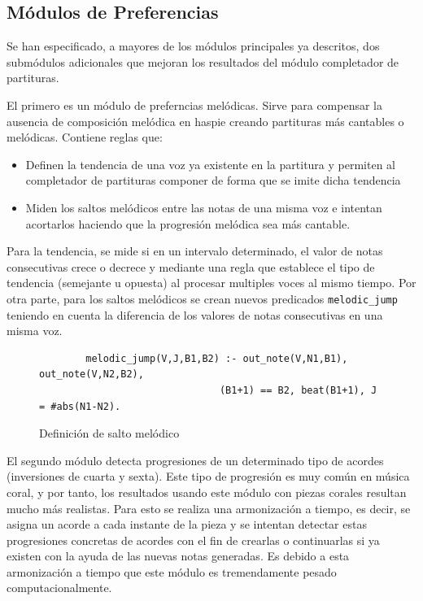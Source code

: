 \subsection{Módulos de Preferencias}
Se han especificado, a mayores de los módulos principales ya descritos, dos submódulos adicionales que mejoran los resultados del módulo completador de partituras.

El primero es un módulo de preferncias melódicas. Sirve para compensar la ausencia de composición melódica en haspie creando partituras más cantables o melódicas. Contiene reglas que:
\begin{itemize}
	\item Definen la tendencia de una voz ya existente en la partitura y permiten al completador de partituras componer de forma que se imite dicha tendencia
	\item Miden los saltos melódicos entre las notas de una misma voz e intentan acortarlos haciendo que la progresión melódica sea más cantable.
\end{itemize}

Para la tendencia, se mide si en un intervalo determinado, el valor de notas consecutivas crece o decrece y mediante una regla que establece el tipo de tendencia (semejante u opuesta) al procesar multiples voces al mismo tiempo. Por otra parte, para los saltos melódicos se crean nuevos predicados \texttt{melodic\_jump} teniendo en cuenta la diferencia de los valores de notas consecutivas en una misma voz.

\begin{figure} [h]
	\centering
	\begin{verbatim}
		melodic_jump(V,J,B1,B2) :- out_note(V,N1,B1), out_note(V,N2,B2),
		                       (B1+1) == B2, beat(B1+1), J = #abs(N1-N2). 
	\end{verbatim}
	\label{fig:melodic-jump}
	\caption{Definición de salto melódico}
\end{figure}


El segundo módulo detecta progresiones de un determinado tipo de acordes (inversiones de cuarta y sexta). Este tipo de progresión es muy común en música coral, y por tanto, los resultados usando este módulo con piezas corales resultan mucho más realistas. Para esto se realiza una armonización a tiempo, es decir, se asigna un acorde a cada instante de la pieza y se intentan detectar estas progresiones concretas de acordes con el fin de crearlas o continuarlas si ya existen con la ayuda de las nuevas notas generadas. Es debido a esta armonización a tiempo que este módulo es tremendamente pesado computacionalmente.

